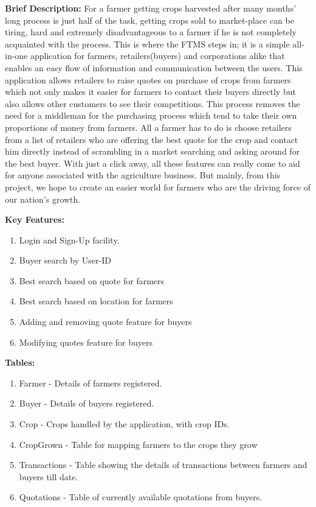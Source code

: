 \documentclass[12pt]{article}
\begin{document}
\noindent
\textbf{Brief Description:}
\newline
For a farmer getting crops harvested after many months' long process is just half of the task, getting crops sold to market-place can be tiring, hard and extremely disadvantageous to a farmer if he is not completely acquainted with the process. This is where the FTMS steps in; it is a simple all-in-one application for farmers, retailers(buyers) and corporations alike that enables an easy flow of information and communication between the users. This application allows retailers to raise quotes on purchase of crops from farmers which not only makes it easier for farmers to contact their buyers directly but also allows other customers to see their competitions. This process removes the need for a middleman for the purchasing process which tend to take their own proportions of money from farmers. All a farmer has to do is choose retailers from a list of retailers who are offering the best quote for the crop and contact him directly instead of scrambling in a market searching and asking around for the best buyer. With just a click away, all these features can really come to aid for anyone associated with the agriculture business. But mainly, from this project, we hope to create an easier world for farmers who are the driving force of our nation's growth. 

\noindent
\textbf{Key Features:}
\begin{enumerate}
    \item Login and Sign-Up facility.
    \item Buyer search by User-ID
    \item Best search based on quote for farmers
    \item Best search based on location for farmers
    \item Adding and removing quote feature for buyers
    \item Modifying quotes feature for buyers
\end{enumerate}


\noindent
\textbf{Tables:}
\begin{enumerate}
    \item Farmer - Details of farmers registered.
    \item Buyer - Details of buyers registered.
    \item Crop - Crops handled by the application, with crop IDs.
    \item Crop\textunderscore Grown - Table for mapping farmers to the crops they grow
    \item Transactions - Table showing the details of transactions between farmers and buyers till date.
    \item Quotations - Table of currently available quotations from buyers.
\end{enumerate}
\end{document}
